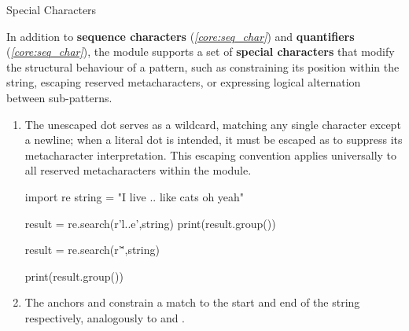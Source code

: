 \documentclass[10pt]{article}
\begin{document}
  \begin{core}{Special Characters}

    In addition to \textbf{sequence characters} (\textit{\autoref{core:seq_char}}) and \textbf{quantifiers} (\textit{\autoref{core:seq_char}}), the  module supports a set of \textbf{special characters} that modify the structural behaviour of a pattern, such as constraining its position within the string, escaping reserved metacharacters, or expressing logical alternation between sub-patterns.

    \begin{enumerate}

      \item The unescaped dot  serves as a wildcard, matching any single character except a newline; when a literal dot is intended, it must be escaped as  to suppress its metacharacter interpretation. This escaping convention applies universally to all reserved metacharacters within the  module.

      \begin{pyconsole}

        import re
        string = "I live .. like cats oh yeah"

        result = re.search(r'l..e',string)
        print(result.group())

        result = re.search(r'\.\.',string)

        print(result.group())

      \end{pyconsole}

      \item The anchors \textcode{\^{}} and \textcode{\$} constrain a match to the start and end of the string respectively, analogously to  and . 



\end{enumerate}
\end{core}
\end{document}
